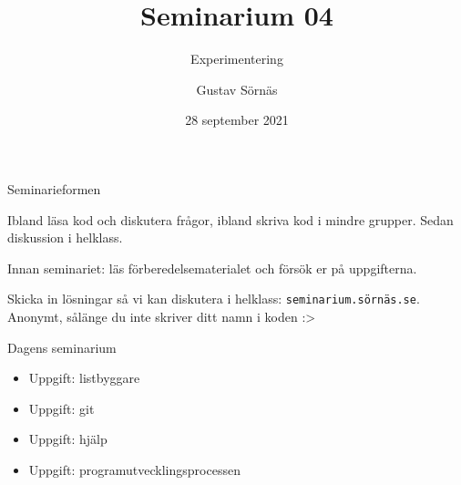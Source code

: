 \documentclass{beamer}
\title{Seminarium 04}
\subtitle{Experimentering}
\date{28 september 2021}
\author{Gustav Sörnäs}
\begin{document}
  \frame{\titlepage}

  \begin{frame}{Seminarieformen}

    Ibland läsa kod och diskutera frågor, ibland skriva kod i mindre grupper.
    Sedan diskussion i helklass.

    Innan seminariet: läs förberedelsematerialet och försök er på uppgifterna.

    Skicka in lösningar så vi kan diskutera i helklass:
    \texttt{seminarium.sörnäs.se}. Anonymt, sålänge du inte skriver ditt namn i
    koden :>

  \end{frame}

  \begin{frame}{Dagens seminarium}

    \begin{itemize}
      \item Uppgift: listbyggare
      \item Uppgift: git
      \item Uppgift: hjälp
      \item Uppgift: programutvecklingsprocessen
    \end{itemize}

  \end{frame}

  
\end{document}
